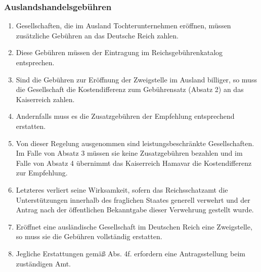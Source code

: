 \documentclass{article}
\begin{document}
\subsubsection{Auslandshandelsgebühren}
\begin{enumerate}[(1)]
    \item Gesellschaften, die im Ausland Tochterunternehmen eröffnen, müssen zusätzliche Gebühren an das Deutsche Reich zahlen.
    \item Diese Gebühren müssen der Eintragung im Reichsgebührenkatalog entsprechen. 
    \item Sind die Gebühren zur Eröffnung der Zweigstelle im Ausland billiger, so muss die Gesellschaft die Kostendifferenz zum Gebührensatz (Absatz 2) an das Kaiserreich zahlen.
    \item Andernfalls muss es die Zusatzgebühren der Empfehlung entsprechend erstatten.
    \item Von dieser Regelung ausgenommen sind leistungsbeschränkte Gesellschaften. Im Falle von Absatz 3 müssen sie keine Zusatzgebühren bezahlen und im Falle von Absatz 4 übernimmt das Kaiserreich Hamavar die Kostendifferenz zur Empfehlung.
    \item Letzteres verliert seine Wirksamkeit, sofern das Reichsschatzamt die Unterstützungen innerhalb des fraglichen Staates generell verwehrt und der Antrag nach der öffentlichen Bekanntgabe dieser Verwehrung gestellt wurde.
    \item Eröffnet eine ausländische Gesellschaft im Deutschen Reich eine Zweigstelle, so muss sie die Gebühren vollständig erstatten.
    \item Jegliche Erstattungen gemäß Abs. 4f. erfordern eine Antragsstellung beim zuständigen Amt.
\end{enumerate}
\end{document}
